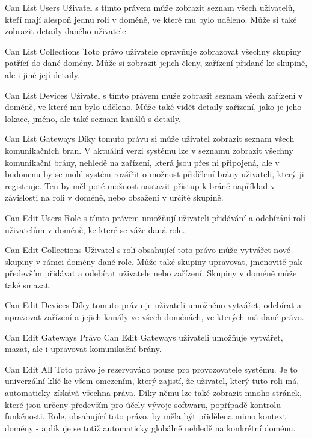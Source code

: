 \def\myprefix{P}
\begin{enumfunctional}[style=nextline]
\item[Can List Users]
Uživatel s tímto právem může zobrazit seznam všech uživatelů, kteří mají alespoň jednu roli v doméně, ve které mu bylo uděleno. Může si také zobrazit detaily daného uživatele.
\item[Can List Collections]
Toto právo uživatele opravňuje zobrazovat všechny skupiny patřící do dané domény. Může si zobrazit jejich členy, zařízení přidané ke skupině, ale i jiné její detaily.
\item[Can List Devices]
Uživatel s tímto právem může zobrazit seznam všech zařízení v doméně, ve které mu bylo uděleno. Může také vidět detaily zařízení, jako je jeho lokace, jméno, ale také seznam kanálů s detaily.
\item[Can List Gateways]
Díky tomuto právu si může uživatel zobrazit seznam všech komunikačních bran. V aktuální verzi systému lze v seznamu zobrazit všechny komunikační brány, nehledě na zařízení, která jsou přes ni připojená, ale v budoucnu by se mohl systém rozšířit o možnost přidělení brány uživateli, který ji registruje. Ten by měl poté možnost nastavit přístup k bráně například v závislosti na roli v doméně, nebo obsažení v určité skupině.
\item[Can Edit Users]
Role s tímto právem umožňují uživateli přidávání a odebírání rolí uživatelům v doméně, ke které se váže daná role.
\item[Can Edit Collections]
Uživatel s rolí obsahující toto právo může vytvářet nové skupiny v rámci domény dané role. Může také skupiny upravovat, jmenovitě pak především přidávat a odebírat uživatele nebo zařízení. Skupiny v doméně může také smazat.
\item[Can Edit Devices]
Díky tomuto právu je uživateli umožněno vytvářet, odebírat a upravovat zařízení a jejich kanály ve všech doménách, ve kterých má dané právo.
\item[Can Edit Gateways]
Právo Can Edit Gateways uživateli umožňuje vytvářet, mazat, ale i upravovat komunikační brány.
\item[Can Edit All]
Toto právo je rezervováno pouze pro provozovatele systému. Je to univerzální klíč ke všem omezením, který zajistí, že uživatel, který tuto roli má, automaticky získává všechna práva. Díky němu lze také zobrazit mnoho stránek, které jsou určeny především pro účely vývoje softwaru, popřípadě kontrolu funkčnosti. Role, obsahující toto právo, by měla být přidělena mimo kontext domény - aplikuje se totiž automaticky globálně nehledě na konkrétní doménu.
\end{enumfunctional}

